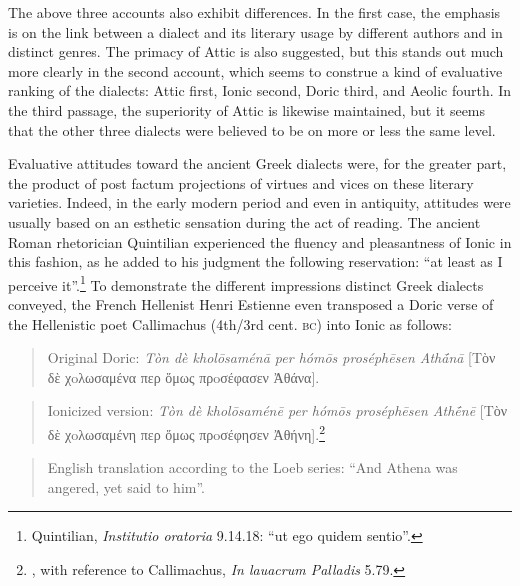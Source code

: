 The above three accounts also exhibit differences. In the first case, the emphasis is on the link between a dialect and its literary usage by different authors and in distinct genres. The primacy of Attic is also suggested, but this stands out much more clearly in the second account, which seems to construe a kind of evaluative ranking of the dialects: Attic first, Ionic second, Doric third, and Aeolic fourth. In the third passage, the superiority of Attic is likewise maintained, but it seems that the other three dialects were believed to be on more or less the same level.

Evaluative attitudes toward the ancient Greek dialects were, for the greater part, the product of post factum projections of virtues and vices on these literary varieties. Indeed, in the early modern period and even in antiquity, attitudes were usually based on an esthetic sensation during the act of reading. The ancient Roman rhetorician Quintilian experienced the fluency and pleasantness of Ionic in this fashion, as he added to his judgment the following reservation: “at least as I perceive it”.\footnote{Quintilian, \textit{Institutio oratoria} 9.14.18: “ut ego quidem sentio”.} To demonstrate the different impressions distinct Greek dialects conveyed, the French Hellenist Henri Estienne even transposed a Doric verse of the Hellenistic poet Callimachus (4th/3rd cent. \textsc{bc}) into Ionic as follows:

\begin{quote}
Original Doric: \textit{Tòn dè kholōsaménā per hómōs proséphēsen Athā́nā} [Tὸν δὲ χoλωσαμένα περ ὅμως πρoσέφασεν Ἀθάνα].
\end{quote}

\begin{quote}
Ionicized version: \textit{Tòn dè kholōsaménē per hómōs proséphēsen Athḗnē} [Tὸν δὲ χoλωσαμένη περ ὅμως πρoσέφησεν Ἀθήνη].\footnote{\citet[15--16]{Estienne1581}, with reference to Callimachus, \textit{In lauacrum Palladis} 5.79.}
\end{quote}

\begin{quote}
English translation according to the Loeb series: “And Athena was angered, yet said to him”.
\end{quote}

